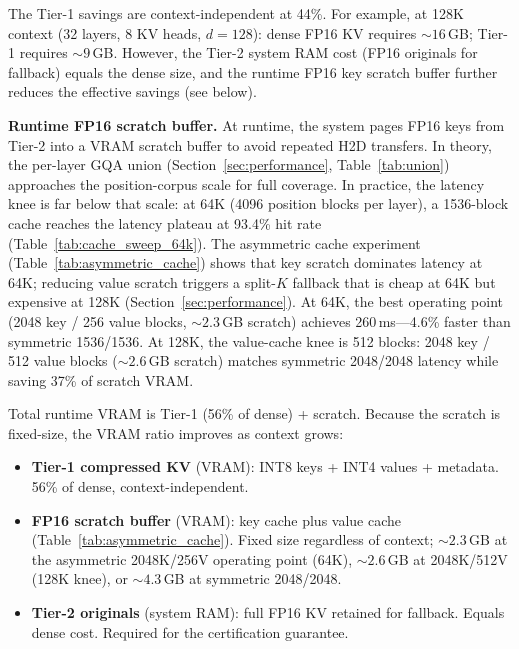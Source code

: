 \documentclass[10pt,twocolumn,a4paper]{article}
\theoremstyle{definition}
\theoremstyle{remark}
\begin{document}
The Tier-1 savings are context-independent at 44\%.  For example, at 128K context (32 layers, 8 KV heads, $d{=}128$): dense FP16 KV requires ${\sim}16$\,GB; Tier-1 requires ${\sim}9$\,GB.  However, the Tier-2 system RAM cost (FP16 originals for fallback) equals the dense size, and the runtime FP16 key scratch buffer further reduces the effective savings (see below).

\textbf{Runtime FP16 scratch buffer.}  At runtime, the system pages FP16 keys from Tier-2 into a VRAM scratch buffer to avoid repeated H2D transfers.  In theory, the per-layer GQA union (Section~\ref{sec:performance}, Table~\ref{tab:union}) approaches the position-corpus scale for full coverage.  In practice, the latency knee is far below that scale: at 64K (4096 position blocks per layer), a 1536-block cache reaches the latency plateau at 93.4\% hit rate (Table~\ref{tab:cache_sweep_64k}).  The asymmetric cache experiment (Table~\ref{tab:asymmetric_cache}) shows that key scratch dominates latency at 64K; reducing value scratch triggers a split-$K$ fallback that is cheap at 64K but expensive at 128K (Section~\ref{sec:performance}).  At 64K, the best operating point (2048 key / 256 value blocks, ${\sim}2.3$\,GB scratch) achieves 260\,ms---4.6\% faster than symmetric 1536/1536.  At 128K, the value-cache knee is 512 blocks: 2048 key / 512 value blocks (${\sim}2.6$\,GB scratch) matches symmetric 2048/2048 latency while saving 37\% of scratch VRAM.

Total runtime VRAM is Tier-1 (56\% of dense) + scratch.  Because the scratch is fixed-size, the VRAM ratio improves as context grows:

\begin{itemize}[leftmargin=*,itemsep=2pt]
\item \textbf{Tier-1 compressed KV} (VRAM): INT8 keys + INT4 values + metadata.  56\% of dense, context-independent.
\item \textbf{FP16 scratch buffer} (VRAM): key cache plus value cache (Table~\ref{tab:asymmetric_cache}).  Fixed size regardless of context; ${\sim}2.3$\,GB at the asymmetric 2048K/256V operating point (64K), ${\sim}2.6$\,GB at 2048K/512V (128K knee), or ${\sim}4.3$\,GB at symmetric 2048/2048.
\item \textbf{Tier-2 originals} (system RAM): full FP16 KV retained for fallback.  Equals dense cost.  Required for the certification guarantee.
\end{itemize}
\end{document}
